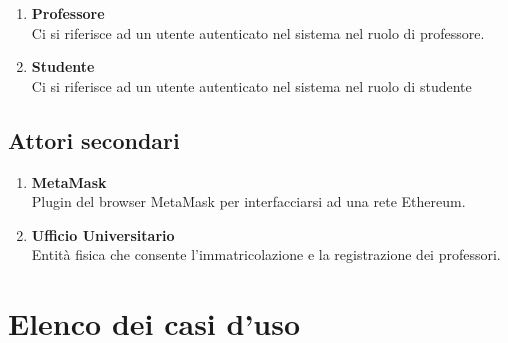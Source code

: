 \documentclass[AnalisiDeiRequisiti.tex]{subfiles}
\begin{document}
\begin{enumerate}
	\item \textbf{Professore}\\
	Ci si riferisce ad un utente autenticato nel sistema nel ruolo di professore.\\
	
	\item \textbf{Studente}\\
	Ci si riferisce ad un utente autenticato nel sistema nel ruolo di studente\\	
\end{enumerate}

\subsection{Attori secondari}
\begin{enumerate}
	\item \textbf{MetaMask}\\
	Plugin del browser MetaMask per interfacciarsi ad una rete Ethereum.\\
	
	\item \textbf{Ufficio Universitario}\\
	Entità fisica che consente l'immatricolazione e la registrazione dei professori.\\
\end{enumerate}

\section{Elenco dei casi d'uso}
\end{document}
